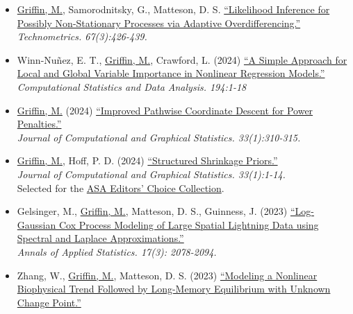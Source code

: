 \documentclass[11pt]{article}
\newcommand{\tab}{\hspace*{2em}}
\begin{document}
\begin{itemize}
		\item[] \underline{Griffin, M.}, Samorodnitsky, G., Matteson, D. S. \href{https://arxiv.org/abs/2011.04168}{``Likelihood Inference for Possibly Non-Stationary Processes via Adaptive Overdifferencing.''} \\
	\tab \emph{Technometrics. 67(3):426-439.} \vspace{-2mm}
		\item[] Winn-Nu\~{n}ez, E. T., \underline{Griffin, M.}, Crawford, L. (2024) \href{https://www.sciencedirect.com/science/article/pii/S0167947323002256}{``A Simple Approach for Local and Global Variable Importance in Nonlinear Regression Models.''} \\
	\tab \emph{Computational Statistics and Data Analysis. 194:1-18} \vspace{-2mm}
	\item[] \underline{Griffin, M.} (2024) \href{https://www.tandfonline.com/doi/abs/10.1080/10618600.2023.2256807}{``Improved Pathwise Coordinate Descent for Power Penalties.''} \\
	\tab \emph{Journal of Computational and Graphical Statistics. 33(1):310-315.} \vspace{-2mm}
	\item[] \underline{Griffin, M.}, Hoff, P. D. (2024) \href{https://www-tandfonline-com.silk.library.umass.edu/doi/full/10.1080/10618600.2023.2233577}{``Structured Shrinkage Priors.''} \\
	\tab \emph{Journal of Computational and Graphical Statistics. 33(1):1-14.} \\
	\tab Selected for the \href{https://www.tandfonline.com/journals/uasa20/collections/EditorsChoiceCollectionUASA}{ASA Editors' Choice Collection}. \vspace{-2mm}
	\item[] Gelsinger, M., \underline{Griffin, M.}, Matteson, D. S., Guinness, J. (2023) \href{https://projecteuclid.org/journals/annals-of-applied-statistics/volume-17/issue-3/Log-Gaussian-Cox-process-modeling-of-large-spatial-lightning-data/10.1214/22-AOAS1708.short}{``Log-Gaussian Cox Process Modeling of Large Spatial Lightning Data using Spectral and Laplace Approximations.''} \\
	\tab \emph{Annals of Applied Statistics. 17(3): 2078-2094.} \vspace{-2mm}
	\item[] Zhang, W., \underline{Griffin, M.}, Matteson, D. S. (2023) \href{https://projecteuclid.org/journals/annals-of-applied-statistics/volume-17/issue-1/Modeling-a-nonlinear-biophysical-trend-followed-by-long-memory-equilibrium/10.1214/22-AOAS1655.short}{``Modeling a Nonlinear Biophysical Trend Followed by Long-Memory Equilibrium with Unknown Change Point.''} \\

\end{itemize}
\end{document}
